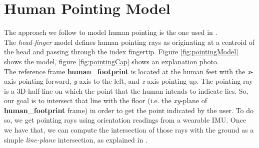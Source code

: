 \section{Human Pointing Model} \label{sec:1.2}
The approach we follow to model human pointing is the one used in \cite{gromov2018robot}. \\
The \emph{head-finger} model defines human pointing rays as originating at a centroid of the head and passing through the index fingertip. Figure \ref{fig:pointingModel} shows the model, figure \ref{fig:pointingCap} shows an explanation photo.\\
The reference frame \textbf{human\_footprint} is located at the human feet with the \emph{x}-axis pointing forward, \emph{y}-axis to the left, and \emph{z}-axis pointing up. The pointing ray is a 3D half-line on which the point that the human intends to indicate lies. So, our goal is to intersect that line with the floor (i.e. the \emph{xy}-plane of \textbf{human\_footprint} frame) in order to get the point indicated by the user. To do so, we get pointing rays using orientation readings from a wearable IMU. Once we have that, we can compute the intersection of those rays with the ground as a simple \emph{line-plane} intersection, as explained in \cite{O'Rourke:1998:CGC:289380}.
\\

